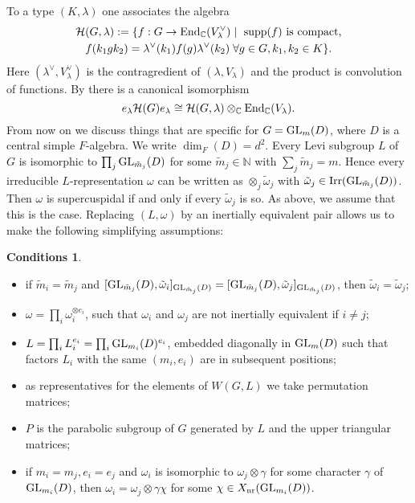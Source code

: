 \documentclass[11pt]{amsart}
\theoremstyle{definition}
\newtheorem{cond}[thm]{Conditions}
\begin{document}
To a type $(K,\lambda)$ one associates the algebra \label{i:20}
\begin{multline*}
{{\mathcal H}} (G,\lambda) := \{f : G \to {{\rm End}}_{\mathbb C} (V_\lambda^\vee) \mid 
\text{ supp}(f) \text{ is compact,} \\
f(k_1 g k_2) = \lambda^\vee (k_1) f(g) \lambda^\vee (k_2) \;
\forall g \in G, k_1,k_2 \in K \} .
\end{multline*}
Here $(\lambda^\vee ,V_\lambda^\vee)$ is the contragredient of $(\lambda,V_\lambda)$ and
the product is convolution of functions. By \cite[(2.12)]{BuKu3} there is a canonical
isomorphism
\begin{equation}\label{eq:1.5}
e_\lambda {{\mathcal H}} (G) e_\lambda \cong {{\mathcal H}} (G,\lambda) \otimes_{\mathbb C} {{\rm End}}_{\mathbb C} (V_\lambda) . 
\end{equation}
From now on we discuss things that are specific for $G = {{\rm GL}}_m (D)$, \label{i:85}
where $D$ is a central simple $F$-algebra. We write $\dim_F (D) = d^2$. Every Levi
subgroup $L$ of $G$ is isomorphic to $\prod_j {{\rm GL}}_{\tilde m_j}(D)$ for some 
$\tilde m_j \in {\mathbb N}$ with $\sum_j \tilde m_j = m$. Hence every irreducible
$L$-representation $\omega$ can be written as $\otimes_j \tilde \omega_j$
with $\tilde \omega_j \in {{\rm Irr}} ({{\rm GL}}_{\tilde m_j}(D))$. Then $\omega$ is supercuspidal 
if and only if every $\tilde \omega_j$ is so. As above, we
assume that this is the case. Replacing $(L,\omega)$ by an inertially equivalent
pair allows us to make the following simplifying assumptions:
\begin{cond} \label{cond} \
\begin{itemize}
\item if $\tilde m_i = \tilde m_j$ and $[{{\rm GL}}_{\tilde m_j}(D),\tilde \omega_i
]_{{{\rm GL}}_{\tilde m_j}(D)} = [{{\rm GL}}_{\tilde m_j}(D),\tilde \omega_j
]_{{{\rm GL}}_{\tilde m_j}(D)}$, then $\tilde \omega_i = \tilde \omega_j$;
\item $\omega = \prod_i \omega_i^{\otimes e_i}$, such that $\omega_i$ and $\omega_j$
are not inertially equivalent if $i \neq j$;
\item $L = \prod_i L_i^{e_i} = \prod_i {{\rm GL}}_{m_i}(D)^{e_i}$, embedded diagonally in 
${{\rm GL}}_m (D)$ such that factors $L_i$ with the same $(m_i,e_i)$ are in subsequent positions;
\item as representatives for the elements of $W(G,L)$ we take permutation matrices;
\item $P$ is the parabolic subgroup of $G$ generated by $L$ and the upper triangular
matrices;
\item if $m_i = m_j, e_i = e_j$ and $\omega_i$ is isomorphic to $\omega_j \otimes \gamma$
for some character $\gamma$ of ${{\rm GL}}_{m_i}(D)$, then $\omega_i = \omega_j \otimes \gamma \chi$
for some $\chi \in X_{{\rm nr}}({{\rm GL}}_{m_i}(D))$.
\end{itemize}
\end{cond}
\end{document}
